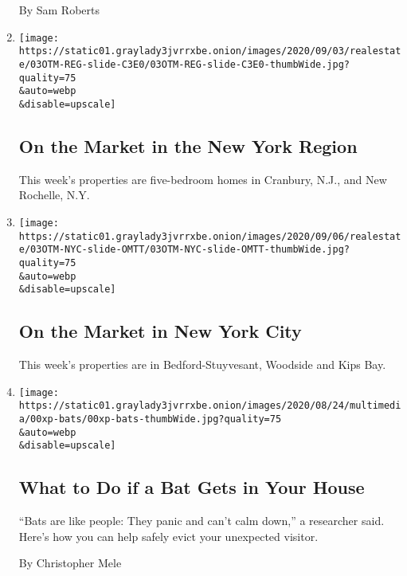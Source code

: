 \begin{enumerate}
  By Sam Roberts
\item
  \href{/slideshow/2020/09/03/realestate/on-the-market-in-the-new-york-region.html}{}

  \texttt{[image: https://static01.graylady3jvrrxbe.onion/images/2020/09/03/realestate/03OTM-REG-slide-C3E0/03OTM-REG-slide-C3E0-thumbWide.jpg?quality=75\\\&auto=webp\\\&disable=upscale]}

  \hypertarget{on-the-market-in-the-new-york-region}{%
  \subsection{On the Market in the New York
  Region}\label{on-the-market-in-the-new-york-region}}

  This week's properties are five-bedroom homes in Cranbury, N.J., and
  New Rochelle, N.Y.
\item
  \href{/slideshow/2020/09/03/realestate/on-the-market-in-new-york-city.html}{}

  \texttt{[image: https://static01.graylady3jvrrxbe.onion/images/2020/09/06/realestate/03OTM-NYC-slide-OMTT/03OTM-NYC-slide-OMTT-thumbWide.jpg?quality=75\\\&auto=webp\\\&disable=upscale]}

  \hypertarget{on-the-market-in-new-york-city}{%
  \subsection{On the Market in New York
  City}\label{on-the-market-in-new-york-city}}

  This week's properties are in Bedford-Stuyvesant, Woodside and Kips
  Bay.
\item
  \href{/2020/09/02/us/remove-prevent-bats.html}{}

  \texttt{[image: https://static01.graylady3jvrrxbe.onion/images/2020/08/24/multimedia/00xp-bats/00xp-bats-thumbWide.jpg?quality=75\\\&auto=webp\\\&disable=upscale]}

  \hypertarget{what-to-do-if-a-bat-gets-in-your-house}{%
  \subsection{What to Do if a Bat Gets in Your
  House}\label{what-to-do-if-a-bat-gets-in-your-house}}

  ``Bats are like people: They panic and can't calm down,'' a researcher
  said. Here's how you can help safely evict your unexpected visitor.

  By Christopher Mele
\end{enumerate}

